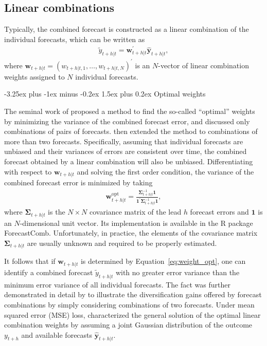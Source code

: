 \documentclass[11pt]{article}
\makeatletter
\newcommand{\pkg}[1]{{\normalfont\fontseries{b}\selectfont #1}}
\let\proglang=\textsf
\renewcommand{\paragraph}{\@startsection{paragraph}{4}{0ex}%
   {-3.25ex plus -1ex minus -0.2ex}%
   {1.5ex plus 0.2ex}%
   {\normalfont\normalsize\bfseries}}
\makeatother
\begin{document}
\subsection{Linear combinations}
\label{sec:linear_comb}

Typically, the combined forecast is constructed as a linear combination of the individual forecasts, which can be written as
\begin{align*}
\tilde{y}_{t+h|t}=\boldsymbol{w}_{t+h|t}^{\prime} \hat{\boldsymbol{y}}_{t+h|t},
\end{align*}
where $\boldsymbol{w}_{t+h|t}=\left(w_{t+h|t, 1}, \ldots, w_{t+h|t, N}\right)^{\prime}$ is an $N$-vector of linear combination weights assigned to $N$ individual forecasts.

\paragraph{Optimal weights}

The seminal work of \citet{Bates1969-yj} proposed a method to find the so-called ``optimal'' weights by minimizing the variance of the combined forecast error, and discussed only combinations of pairs of forecasts. \citet{Newbold1974-lp} then extended the method to combinations of more than two forecasts. Specifically, assuming that individual forecasts are unbiased and their variances of errors are consistent over time, the combined forecast obtained by a linear combination will also be unbiased. Differentiating with respect to $\boldsymbol{w}_{t+h|t}$ and solving the first order condition, the variance of the combined forecast error is minimized by taking
\begin{align}
\label{eq:weight_opt}
\boldsymbol{w}_{t+h|t}^{\text{opt}}=\frac{\boldsymbol{\Sigma}_{t+h|t}^{-1}\boldsymbol{1}}{\boldsymbol{1}^{\prime} \boldsymbol{\Sigma}_{t+h|t}^{-1} \boldsymbol{1}},
\end{align}
where $\boldsymbol{\Sigma}_{t+h|t}$ is the $N \times N$ covariance matrix of the lead $h$ forecast errors and $\boldsymbol{1}$ is an $N$-dimensional unit vector. Its implementation is available in the \proglang{R} package \pkg{ForecastComb}. Unfortunately, in practice, the elements of the covariance matrix $\boldsymbol{\Sigma}_{t+h|t}$ are usually unknown and required to be properly estimated.

It follows that if $\boldsymbol{w}_{t+h|t}$ is determined by Equation~\eqref{eq:weight_opt}, one can identify a combined forecast $\tilde{y}_{t+h|t}$ with no greater error variance than the minimum error variance of all individual forecasts. The fact was further demonstrated in detail by \citet{Timmermann2006-en} to illustrate the diversification gains offered by forecast combinations by simply considering combinations of two forecasts. Under mean squared error (MSE) loss, \citet{Timmermann2006-en} characterized the general solution of the optimal linear combination weights by assuming a joint Gaussian distribution of the outcome $y_{t+h}$ and available forecasts $\hat{\boldsymbol{y}}_{t+h|t}$.
\end{document}
